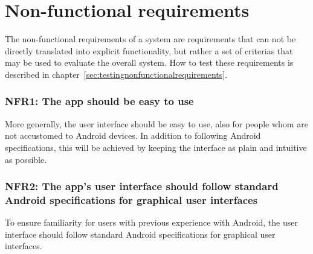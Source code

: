 \section{Non-functional requirements}
The non-functional requirements of a system are requirements that can not be directly translated into explicit functionality, but rather a set of criterias that may be used to evaluate the overall system. How to test these requirements is described in chapter~\ref{sec:testingnonfunctionalrequirements}.

\subsubsection{NFR1: The app should be easy to use}
More generally, the user interface should be easy to use, also for people whom are not accustomed to Android devices. In addition to following Android specifications, this will be achieved by keeping the interface as plain and intuitive as possible. 

\subsubsection{NFR2: The app's user interface should follow standard Android specifications for graphical user interfaces}
To ensure familiarity for users with previous experience with Android, the user interface should follow standard Android specifications for graphical user interfaces.
 
\begin{comment}

\subsubsection{NFR2: Installation guide and documentation}
The system should come with a comprehensive guide to using the system. This should include documentation for operation of the
app along with a guide to what the rest of the system operates. As the team will not be developing hardware for metering and 
aggregating data from homes, the main focus will be on the app and the team's central server. The documentation will contain an outline 
of the intended architecture for the rest of the system.


\begin{itemize}
\item The user interface should follow standard Android specifications. 
\item The applification should not need a lot of extra material to get started (Power devices, own server).
\end{itemize}

\end{comment}
